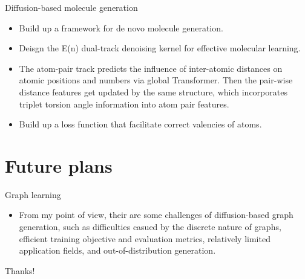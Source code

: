 \documentclass{beamer}
\begin{document}
\begin{frame}{Diffusion-based molecule generation}
    \begin{itemize}
        \item Build up a framework for de novo molecule generation.
        \item Deisgn the E(n) dual-track denoising kernel for effective molecular learning.
        \item The atom-pair track predicts the influence of inter-atomic distances on atomic positions and numbers via global Transformer. Then the pair-wise distance features get updated by the same structure, which incorporates triplet torsion angle information into atom pair features.
        \item Build up a loss function that facilitate correct valencies of atoms.
    \end{itemize}
\end{frame}


\section{Future plans}
\begin{frame}{Graph learning}
    \begin{itemize}
        \item From my point of view, their are some challenges of diffusion-based graph generation, such as difficulties casued by the discrete nature of graphs, efficient training objective and evaluation metrics, relatively limited application fields, and out-of-distribution generation.
    \end{itemize}
\end{frame}

\begin{frame}
    \begin{center}
        {\Huge\calligra Thanks!}
    \end{center}
\end{frame}
\end{document}
